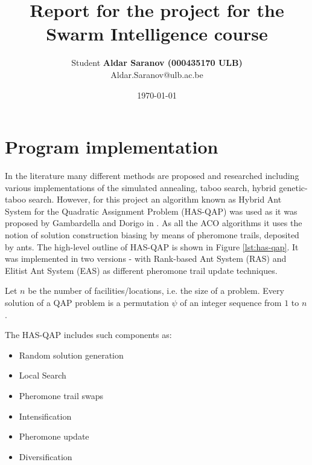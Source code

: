 \documentclass[12pt]{article}
\author{Student \textbf{Aldar Saranov (000435170 ULB)} \\ Aldar.Saranov@ulb.ac.be}
\date{\today}
\title{Report for the project for the Swarm Intelligence course}
\begin{document}
\maketitle
\newpage
\tableofcontents



\section{Program implementation}

In the literature many different methods are proposed and researched including various implementations of the simulated annealing, taboo search, hybrid genetic-taboo search. However, for this project an algorithm known as Hybrid Ant System for the Quadratic Assignment Problem (HAS-QAP) was used as it was proposed by Gambardella and Dorigo in \cite{Gambardella}. As all the ACO algorithms it uses the notion of solution construction biasing by means of pheromone trails, deposited by ants. The high-level outline of HAS-QAP is shown in Figure \ref{lst:has-qap}. It was implemented in two versions - with Rank-based Ant System (RAS) and Elitist Ant System (EAS) as different pheromone trail update techniques.

Let $n$ be the number of facilities/locations, i.e. the size of a problem. Every solution of a QAP problem is a permutation $\psi$ of an integer sequence from $1$ to $n$.

The HAS-QAP includes such components as:

\begin{itemize}
\item Random solution generation
\item Local Search
\item Pheromone trail swaps
\item Intensification
\item Pheromone update
\item Diversification
\end{itemize}
\end{document}
